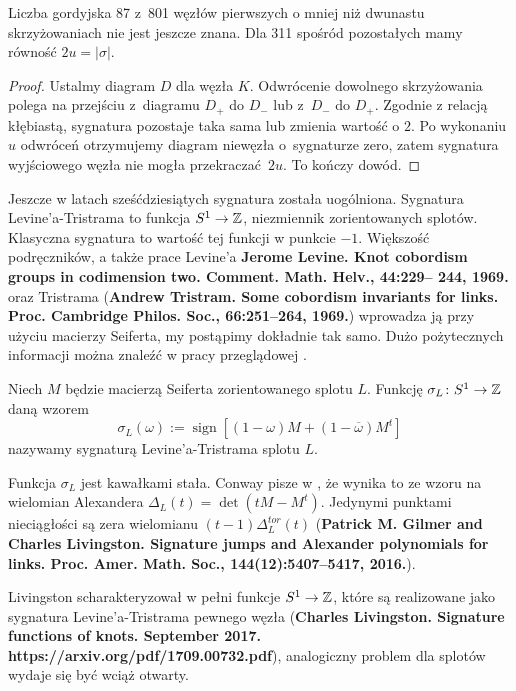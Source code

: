 Liczba gordyjska 87 z~801 węzłów pierwszych o mniej niż dwunastu skrzyżowaniach nie jest jeszcze znana.
Dla 311 spośród pozostałych mamy równość $2u = |\sigma|$.

\begin{proof}
    Ustalmy diagram $D$ dla węzła $K$.
    Odwrócenie dowolnego skrzyżowania polega na przejściu z~diagramu $D_+$ do $D_-$ lub z~$D_-$ do $D_+$.
    Zgodnie z relacją kłębiastą, sygnatura pozostaje taka sama lub zmienia wartość o $2$.
    Po wykonaniu $u$ odwróceń otrzymujemy diagram niewęzła o~sygnaturze zero, zatem sygnatura wyjściowego węzła nie mogła przekraczać $2u$.
    To kończy dowód.
\end{proof}

Jeszcze w latach sześćdziesiątych sygnatura została uogólniona.
Sygnatura Levine'a-Tristrama to funkcja $S^1 \to \mathbb Z$, niezmiennik zorientowanych splotów.
Klasyczna sygnatura to wartość tej funkcji w punkcie $-1$.
Większość podręczników, a także prace Levine'a \textbf{Jerome Levine. Knot cobordism groups in codimension two. Comment. Math. Helv., 44:229– 244, 1969.} oraz Tristrama (\textbf{Andrew Tristram. Some cobordism invariants for links. Proc. Cambridge Philos. Soc., 66:251–264, 1969.}) wprowadza ją przy użyciu macierzy Seiferta, my postąpimy dokładnie tak samo.
Dużo pożytecznych informacji można znaleźć w pracy przeglądowej \cite{conway19}.

\begin{definition}
    Niech $M$ będzie macierzą Seiferta zorientowanego splotu $L$.
    Funkcję $\sigma_L \colon S^1 \to \mathbb Z$ daną wzorem
    \begin{equation}
        \sigma_L(\omega) := \operatorname{sign} [(1-\omega) M + (1 - \overline{\omega})M^t]
    \end{equation}
    nazywamy sygnaturą Levine'a-Tristrama splotu $L$.
\end{definition}

Funkcja $\sigma_L$ jest kawałkami stała.
Conway pisze w \cite{conway19}, że wynika to ze wzoru na wielomian Alexandera $\Delta_L(t) = \det(tM - M^t)$.
Jedynymi punktami nieciągłości są zera wielomianu $(t-1)\Delta^{tor}_L(t)$ (\textbf{Patrick M. Gilmer and Charles Livingston. Signature jumps and Alexander polynomials for links. Proc. Amer. Math. Soc., 144(12):5407–5417, 2016.}).

Livingston scharakteryzował w pełni funkcje $S^1 \to \mathbb Z$, które są realizowane jako sygnatura Levine'a-Tristrama pewnego węzła (\textbf{Charles Livingston. Signature functions of knots. September 2017.
https://arxiv.org/pdf/1709.00732.pdf}), analogiczny problem dla splotów wydaje się być wciąż otwarty.

